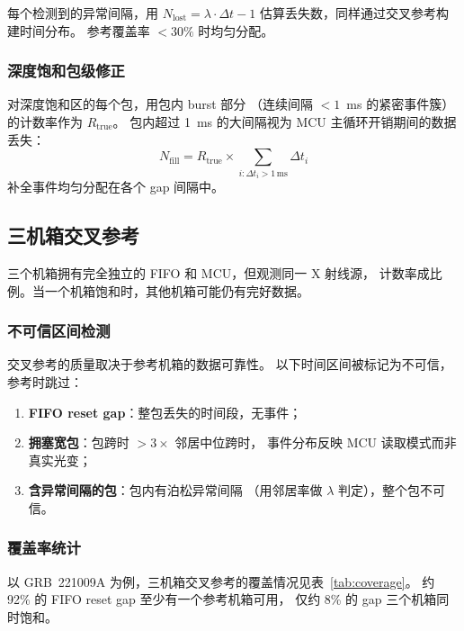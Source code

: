 \documentclass[aps,prd,twocolumn,nofootinbib,superscriptaddress]{revtex4-2}
\begin{document}
每个检测到的异常间隔，用 $N_\mathrm{lost} = \lambda \cdot \Delta t - 1$
估算丢失数，同样通过交叉参考构建时间分布。
参考覆盖率 $< 30\%$ 时均匀分配。

\subsubsection{深度饱和包级修正}

对深度饱和区的每个包，用包内 burst 部分
（连续间隔 $< 1$~ms 的紧密事件簇）的计数率作为 $R_\mathrm{true}$。
包内超过 1~ms 的大间隔视为 MCU 主循环开销期间的数据丢失：
\begin{equation}\label{eq:deep}
  N_\mathrm{fill} = R_\mathrm{true} \times \sum_{i: \Delta t_i > 1\,\text{ms}} \Delta t_i
\end{equation}
补全事件均匀分配在各个 gap 间隔中。

\subsection{三机箱交叉参考}\label{sec:crossref}

三个机箱拥有完全独立的 FIFO 和 MCU，但观测同一 X 射线源，
计数率成比例。当一个机箱饱和时，其他机箱可能仍有完好数据。

\subsubsection{不可信区间检测}

交叉参考的质量取决于参考机箱的数据可靠性。
以下时间区间被标记为不可信，参考时跳过：

\begin{enumerate}
  \item \textbf{FIFO reset gap}：整包丢失的时间段，无事件；
  \item \textbf{拥塞宽包}：包跨时 $> 3 \times$ 邻居中位跨时，
    事件分布反映 MCU 读取模式而非真实光变；
  \item \textbf{含异常间隔的包}：包内有泊松异常间隔
    （用邻居率做 $\lambda$ 判定），整个包不可信。
\end{enumerate}

\subsubsection{覆盖率统计}

以 GRB~221009A 为例，三机箱交叉参考的覆盖情况见表~\ref{tab:coverage}。
约 92\% 的 FIFO reset gap 至少有一个参考机箱可用，
仅约 8\% 的 gap 三个机箱同时饱和。
\end{document}
